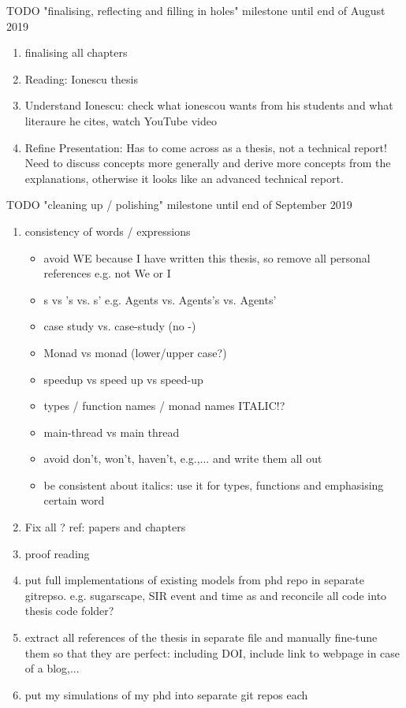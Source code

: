 \documentclass[oneside]{book}
\begin{document}
TODO "finalising, reflecting and filling in holes" milestone until end of August 2019
\begin{enumerate}
	\item finalising all chapters
	
	\item Reading: Ionescu thesis
	
	\item Understand Ionescu: check what ionescou wants from his students and what literaure he cites, watch YouTube video

	\item Refine Presentation: Has to come across as a thesis, not a technical report! Need to discuss concepts more generally and derive more concepts from the explanations, otherwise it looks like an advanced technical report.
\end{enumerate}

TODO "cleaning up / polishing" milestone until end of September 2019
\begin{enumerate}
	\item consistency of words / expressions
		\begin{itemize}
			\item avoid WE because I have written this thesis, so remove all personal references e.g. not We or I
			\item s vs 's vs. s' e.g. Agents vs. Agents's vs. Agents'
			\item case study vs. case-study (no -)
			\item Monad vs monad (lower/upper case?)
			\item speedup vs speed up vs speed-up
			\item types / function names / monad names ITALIC!?
			\item main-thread vs main thread
			\item avoid don't, won't, haven't, e.g.,... and write them all out
			\item be consistent about italics: use it for types, functions and emphasising certain word
		\end{itemize}
		
	\item Fix all ? ref: papers and chapters
		
	\item proof reading
	
	\item put full implementations of existing models from phd repo in separate gitrepso. e.g. sugarscape, SIR event and time as and reconcile all code into thesis code folder?
	
	\item extract all references of the thesis in separate file and manually fine-tune them so that they are perfect: including DOI, include link to webpage in case of a blog,...
	
	\item put my simulations of my phd into separate git repos each
\end{enumerate}
\end{document}
